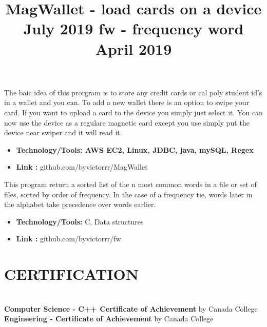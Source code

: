 \documentclass[margin]{res}
\begin{document}
\begin{resume}
{%
\location{}
\title{\textbf{ MagWallet - load cards on a device  \hfill July 2019 }}
\begin{position}
	The baic idea of this prorgram is to store any credit cards or cal poly student id's in a wallet and you can. To add a new wallet there is an option to swipe your card. If you want to upload a card to the device you simply just select it. You can now use the device as a regulare magnetic card except you use simply put the device near swiper and it will read it.
\begin{itemize}
	\item \textbf{Technology/Tools: AWS EC2, Linux, JDBC, java, mySQL, Regex}
\end{itemize}
\begin{itemize}
\item \textbf{Link :} github.com/byvictorrr/MagWallet
\end{itemize}
\end{position}





\location{}
\title{\textbf{ fw - frequency word  \hfill April 2019}}
\begin{position}
 This program return a sorted list of the n most common words in a file or set of files, sorted by order of frequency. In the case of a frequency tie, words later in the alphabet take precedence over words earlier. 
\begin{itemize}
\item \textbf{Technology/Tools:} C, Data structures
\end{itemize}
\begin{itemize}
\item \textbf{Link :} github.com/byvictorrr/fw
\end{itemize}
\end{position}


\section{CERTIFICATION}
\par
\normalfont{}
\\
\normalfont{}\textbullet{} \textbf{Computer Science - C++ Certificate of Achievement} by Canada College
\\ 
\textbullet{} \textbf{Engineering - Certificate of Achievement} by Canada College 


}
\end{resume}
\end{document}
